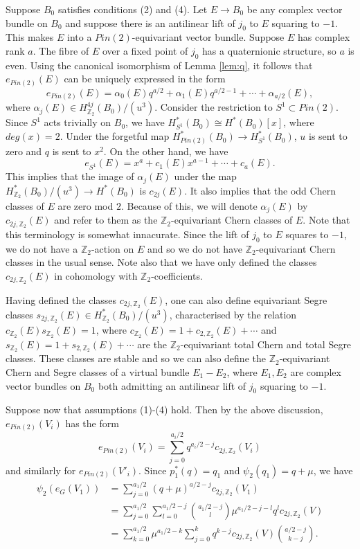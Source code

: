 \documentclass{amsart}
\theoremstyle{definition}
\theoremstyle{remark}
\numberwithin{equation}{section}
\begin{document}
Suppose $B_0$ satisfies conditions (2) and (4). Let $E \to B_0$ be any complex vector bundle on $B_0$ and suppose there is an antilinear lift of $j_0$ to $E$ squaring to $-1$. This makes $E$ into a $Pin(2)$-equivariant vector bundle. Suppose $E$ has complex rank $a$. The fibre of $E$ over a fixed point of $j_0$ has a quaternionic structure, so $a$ is even. Using the canonical isomorphism of Lemma \ref{lem:q}, it follows that $e_{Pin(2)}(E)$ can be uniquely expressed in the form
\[
e_{Pin(2)}(E) = \alpha_0(E) q^{a/2} + \alpha_1(E) q^{a/2-1} + \cdots + \alpha_{a/2}(E),
\]
where $\alpha_j(E) \in H^{4j}_{\mathbb{Z}_2}(B_0)/(u^3)$. Consider the restriction to $S^1 \subset Pin(2)$. Since $S^1$ acts trivially on $B_0$, we have $H^*_{S^1}(B_0) \cong H^*(B_0)[x]$, where $deg(x) = 2$. Under the forgetful map $H^*_{Pin(2)}(B_0) \to H^*_{S^1}(B_0)$, $u$ is sent to zero and $q$ is sent to $x^2$. On the other hand, we have
\[
e_{S^1}(E) = x^a + c_1(E)x^{a-1} + \cdots + c_{a}(E).
\]
This implies that the image of $\alpha_j(E)$ under the map $H^*_{\mathbb{Z}_2}(B_0)/(u^3) \to H^*(B_0)$ is $c_{2j}(E)$. It also implies that the odd Chern classes of $E$ are zero mod $2$. Because of this, we will denote $\alpha_j(E)$ by $c_{2j , \mathbb{Z}_2}(E)$ and refer to them as the $\mathbb{Z}_2$-equivariant Chern classes of $E$. Note that this terminology is somewhat innacurate. Since the lift of $j_0$ to $E$ squares to $-1$, we do not have a $\mathbb{Z}_2$-action on $E$ and so we do not have $\mathbb{Z}_2$-equivariant Chern classes in the usual sense. Note also that we have only defined the classes $c_{2j,\mathbb{Z}_2}(E)$ in cohomology with $\mathbb{Z}_2$-coefficients.
 
Having defined the classes $c_{2j,\mathbb{Z}_2}(E)$, one can also define equivariant Segre classes $s_{2j,\mathbb{Z}_2}(E) \in H^*_{\mathbb{Z}_2}(B_0)/(u^3)$, characterised by the relation $c_{\mathbb{Z}_2}(E) s_{\mathbb{Z}_2}(E) = 1$, where $c_{\mathbb{Z}_2}(E) = 1 + c_{2,\mathbb{Z}_2}(E) + \cdots $ and $s_{\mathbb{Z}_2}(E) = 1 + s_{2,\mathbb{Z}_2}(E) + \cdots $ are the $\mathbb{Z}_2$-equivariant total Chern and total Segre classes. These classes are stable and so we can also define the $\mathbb{Z}_2$-equivariant Chern and Segre classes of a virtual bundle $E_1 - E_2$, where $E_1,E_2$ are complex vector bundles on $B_0$ both admitting an antilinear lift of $j_0$ squaring to $-1$.

Suppose now that assumptions (1)-(4) hold. Then by the above discussion, $e_{Pin(2)}(V_i)$ has the form
\[
e_{Pin(2)}( V_i ) = \sum_{j=0}^{a_i/2} q^{a_i/2 - j} c_{2j , \mathbb{Z}_2}( V_i )
\]
and similarly for $e_{Pin(2)}(V'_i)$. Since $p_1^*(q) = q_1$ and $\psi_2( q_1 ) = q + \mu$, we have
\begin{align*}
\psi_2( e_{G}(V_1) ) &= \sum_{j=0}^{a_1/2} (q+\mu)^{a/2-j} c_{2j , \mathbb{Z}_2}(V_1) \\
&= \sum_{j=0}^{a_1/2} \sum_{l=0}^{a_1/2-j} \binom{a_1/2 - j}{l} \mu^{a_1/2 - j - l} q^l c_{2j, \mathbb{Z}_2}(V) \\
&= \sum_{k=0}^{a_1/2} \mu^{a_1/2 - k } \sum_{j=0}^{k} q^{k-j} c_{2j , \mathbb{Z}_2 }(V) \binom{ a/2 - j}{k-j}.
\end{align*}
\end{document}
